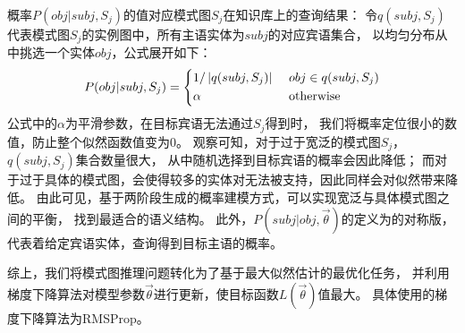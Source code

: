 概率$P(obj | subj, S_j)$的值对应模式图$S_j$在知识库上的查询结果：
令$q(subj, S_j)$代表模式图$S_j$的实例图中，所有主语实体为$subj$的对应宾语集合，
以均匀分布从中挑选一个实体$obj$，公式展开如下：
\begin{equation}
P(obj | subj, S_j) = \left\{
  \begin{aligned}
  & 1 / \left| q(subj, S_j) \right| & ~ & obj \in q(subj, S_j) \\
  & \alpha & ~ & \rm{otherwise} \\
  \end{aligned}
\right.
\end{equation}
公式中的$\alpha$为平滑参数，在目标宾语无法通过$S_j$得到时，
我们将概率定位很小的数值，防止整个似然函数值变为0。
观察可知，对于过于宽泛的模式图$S_j$，$q(subj, S_j)$集合数量很大，
从中随机选择到目标宾语的概率会因此降低；
而对于过于具体的模式图，会使得较多的实体对无法被支持，因此同样会对似然带来降低。
由此可见，基于两阶段生成的概率建模方式，可以实现宽泛与具体模式图之间的平衡，
找到最适合的语义结构。
此外，$P(subj | obj, \vec{\theta})$的定义为的对称版，
代表着给定宾语实体，查询得到目标主语的概率。

综上，我们将模式图推理问题转化为了基于最大似然估计的最优化任务，
并利用梯度下降算法对模型参数$\vec{\theta}$进行更新，使目标函数$L(\vec{\theta})$值最大。
具体使用的梯度下降算法为RMSProp\cite{tieleman2012lecture}。

